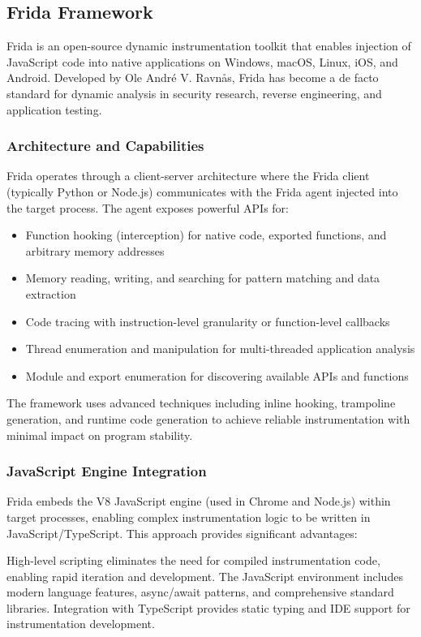\subsection{Frida Framework}

Frida is an open-source dynamic instrumentation toolkit that enables injection of JavaScript code into native applications on Windows, macOS, Linux, iOS, and Android. Developed by Ole André V. Ravnås, Frida has become a de facto standard for dynamic analysis in security research, reverse engineering, and application testing.

\subsubsection{Architecture and Capabilities}
Frida operates through a client-server architecture where the Frida client (typically Python or Node.js) communicates with the Frida agent injected into the target process. The agent exposes powerful APIs for:

\begin{itemize}
    \item Function hooking (interception) for native code, exported functions, and arbitrary memory addresses
    \item Memory reading, writing, and searching for pattern matching and data extraction
    \item Code tracing with instruction-level granularity or function-level callbacks
    \item Thread enumeration and manipulation for multi-threaded application analysis
    \item Module and export enumeration for discovering available APIs and functions
\end{itemize}

The framework uses advanced techniques including inline hooking, trampoline generation, and runtime code generation to achieve reliable instrumentation with minimal impact on program stability.

\subsubsection{JavaScript Engine Integration}
Frida embeds the V8 JavaScript engine (used in Chrome and Node.js) within target processes, enabling complex instrumentation logic to be written in JavaScript/TypeScript. This approach provides significant advantages:

High-level scripting eliminates the need for compiled instrumentation code, enabling rapid iteration and development. The JavaScript environment includes modern language features, async/await patterns, and comprehensive standard libraries. Integration with TypeScript provides static typing and IDE support for instrumentation development.

